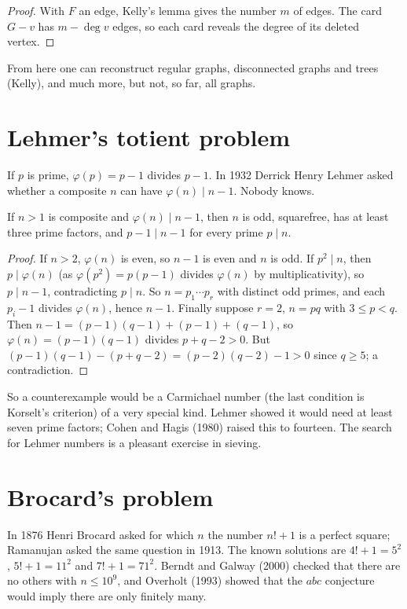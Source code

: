 \begin{proof}
With $F$ an edge, Kelly's lemma gives the number $m$ of edges. The card $G-v$ has $m-\deg v$ edges, so each card reveals the degree of its deleted vertex.
\end{proof}

From here one can reconstruct regular graphs, disconnected graphs and trees (Kelly), and much more, but not, so far, all graphs.

\section{Lehmer's totient problem}

If $p$ is prime, $\varphi(p)=p-1$ divides $p-1$. In 1932 Derrick Henry Lehmer asked whether a composite $n$ can have $\varphi(n)\mid n-1$. Nobody knows.

\begin{proposition}[Lehmer, 1932]\label{prop:lehmer}
If $n>1$ is composite and $\varphi(n)\mid n-1$, then $n$ is odd, squarefree, has at least three prime factors, and $p-1\mid n-1$ for every prime $p\mid n$.
\end{proposition}

\begin{proof}
If $n>2$, $\varphi(n)$ is even, so $n-1$ is even and $n$ is odd. If $p^2\mid n$, then $p\mid\varphi(n)$ (as $\varphi(p^2)=p(p-1)$ divides $\varphi(n)$ by multiplicativity), so $p\mid n-1$, contradicting $p\mid n$. So $n=p_1\cdots p_r$ with distinct odd primes, and each $p_i-1$ divides $\varphi(n)$, hence $n-1$. Finally suppose $r=2$, $n=pq$ with $3\le p<q$. Then $n-1=(p-1)(q-1)+(p-1)+(q-1)$, so $\varphi(n)=(p-1)(q-1)$ divides $p+q-2>0$. But $(p-1)(q-1)-(p+q-2)=(p-2)(q-2)-1>0$ since $q\ge5$; a contradiction.
\end{proof}

So a counterexample would be a Carmichael number (the last condition is Korselt's criterion) of a very special kind. Lehmer showed it would need at least seven prime factors; Cohen and Hagis (1980) raised this to fourteen. The search for Lehmer numbers is a pleasant exercise in sieving.

\section{Brocard's problem}

In 1876 Henri Brocard asked for which $n$ the number $n!+1$ is a perfect square; Ramanujan asked the same question in 1913. The known solutions are $4!+1=5^2$, $5!+1=11^2$ and $7!+1=71^2$. Berndt and Galway (2000) checked that there are no others with $n\le10^9$, and Overholt (1993) showed that the $abc$ conjecture would imply there are only finitely many.

